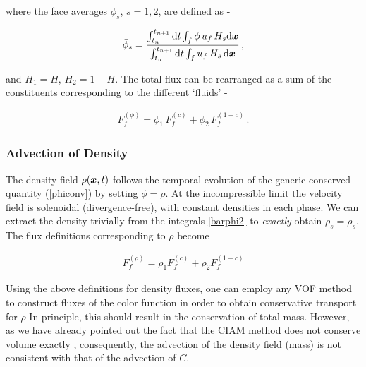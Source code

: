 where the face averages $\bar \phi_s$, $s=1,2$, are defined as - 


\begin{align} 
\bar \phi_s = \frac{\int_{t_n}^{t_{n+1}} {\textrm d}t \int_{f} \phi \,u_f \,H_s  
{\textrm d}\boldsymbol{x}}{\int_{t_n}^{t_{n+1}} {\textrm d}t \int_{f}  
u_f \,H_s\,{\textrm d}\boldsymbol{x}} \,,  
\label{barphi2}
\end{align}


and $H_1=H$, $H_2= 1-H$. 
The total flux can be rearranged as a sum of the constituents 
corresponding to the different `fluids' - 


\begin{align}
F_f^{(\phi)} = \bar \phi_1 \,F_f^{(c)} +  \bar \phi_2 \,F_f^{(1-c)} \,.
\label{fluxphi12}
\end{align}



\subsubsection*{Advection of Density}

The density field $\rho(\boldsymbol{x},t)$ follows the 
temporal evolution of the generic conserved quantity
(\ref{phiconv}) by setting $\phi = \rho$. 
At the incompressible limit the velocity field is 
solenoidal (divergence-free), with constant densities 
in each phase. We can extract the density trivially from the integrals 
\eqref{barphi2} to \textit{exactly} obtain $\bar \rho_s = \rho_s$. 
The flux definitions corresponding to $\rho$ become    


\begin{align}
F_f^{(\rho)} = \rho_1 F_f^{(c)} +  \rho_2 F_f^{(1-c)}
\label{fluxrho}
\end{align}



Using the above definitions for density fluxes,
one can employ any VOF method to construct fluxes of the color 
function in order to obtain conservative transport for $\rho$
In principle, this should result in the conservation of total mass.  
However, as we have already pointed out the fact that the CIAM
method does not conserve volume exactly 
, consequently, the advection of the density field (mass) 
is not consistent with that of the advection of $C$. 

